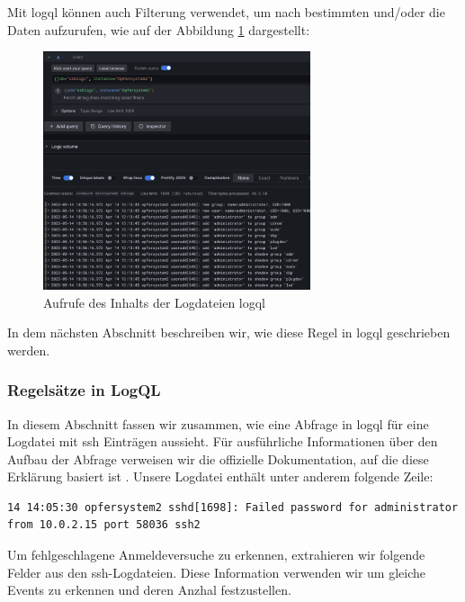 Mit \gls{logql} können auch Filterung verwendet, um nach bestimmten  und/oder  die Daten aufzurufen, wie auf der Abbildung \ref{fig:screenshot_logql} dargestellt:

\begin{figure}[H]
   \centering
   \includegraphics[width=0.7\textwidth]{assets/Logql_labels.png}
   \caption[Aufrufe des Inhalts der Logdateien mit \gls{logql}]
   {Aufrufe des Inhalts der Logdateien \gls{logql}}
   \label{fig:screenshot_logql}
   \centering
\end{figure}

In dem nächsten Abschnitt beschreiben wir, wie diese Regel in \gls{logql} geschrieben werden.

\newpage
\subsubsection{Regelsätze in LogQL}
In diesem Abschnitt fassen wir zusammen, wie eine Abfrage in \gls{logql} für eine Logdatei mit \gls{ssh} Einträgen aussieht. Für ausführliche Informationen über den Aufbau der Abfrage verweisen wir die offizielle Dokumentation, auf die diese Erklärung basiert ist \citep{Grafana_logql}. Unsere Logdatei enthält unter anderem folgende Zeile:

{
\begin{Verbatim}[frame=single]
14 14:05:30 opfersystem2 sshd[1698]: Failed password for administrator
from 10.0.2.15 port 58036 ssh2
\end{Verbatim}
}

Um fehlgeschlagene Anmeldeversuche zu erkennen, extrahieren wir folgende Felder aus den \gls{ssh}-Logdateien. Diese Information verwenden wir um gleiche Events zu erkennen und deren Anzhal festzustellen.

